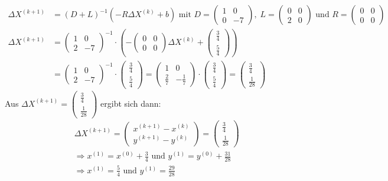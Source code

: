 \begin{align*}
\Delta X^{(k+1)}&=(D+L)^{-1}(-R\Delta X^{(k)}+b) \text{ mit }D=\begin{pmatrix} 1 & 0\\0 & -7 \end{pmatrix},\; L=\begin{pmatrix}
0 & 0 \\ 2 & 0\end{pmatrix} \text{ und } R=\begin{pmatrix}
0 & 0 \\ 0 & 0 \end{pmatrix}\\
\Delta X^{(k+1)}&= \begin{pmatrix} 1 & 0\\2 & -7 \end{pmatrix}^{-1}\cdot\left(-\begin{pmatrix}0 & 0 \\ 0 & 0 \end{pmatrix} \Delta X^{(k)}+ \begin{pmatrix}\frac{3}{4} \\ \frac{5}{4}\end{pmatrix}\right)\\
&= \begin{pmatrix} 1 & 0\\2 & -7 \end{pmatrix}^{-1}\cdot \begin{pmatrix}\frac{3}{4} \\ \frac{5}{4}\end{pmatrix}=\begin{pmatrix} 1 & 0\\\frac{2}{7} & -\frac{1}{7} \end{pmatrix}\cdot \begin{pmatrix}\frac{3}{4} \\ \frac{5}{4}\end{pmatrix}=\begin{pmatrix}
\frac{3}{4}\\\frac{1}{28}
\end{pmatrix}
\end{align*}
Aus $\Delta X^{(k+1)}=\begin{pmatrix}
\frac{3}{4}\\\frac{1}{28}
\end{pmatrix}$ ergibt sich dann:
\begin{align*}
&\Delta X^{(k+1)}=\begin{pmatrix}
x^{(k+1)}-x^{(k)} \\ y^{(k+1)}-y^{(k)}\end{pmatrix}=\begin{pmatrix}
\frac{3}{4}\\\frac{1}{28}
\end{pmatrix}\\
&\Rightarrow x^{(1)}=x^{(0)}+\frac{3}{4} \text{ und } y^{(1)}=y^{(0)}+\frac{31}{28}\\
&\Rightarrow x^{(1)}=\frac{5}{4} \text{ und } y^{(1)}=\frac{29}{28}
\end{align*}

